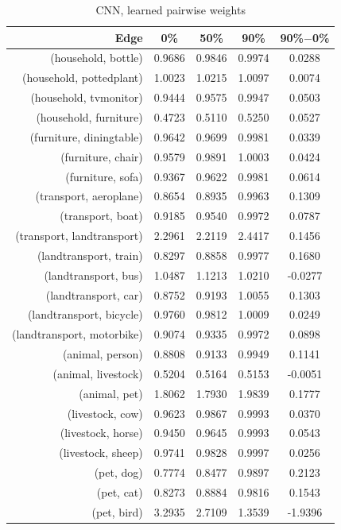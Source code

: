 \documentclass[11pt,a4paper]{article}
\begin{document}
\begin{table}[htbp]
\centering
\begin{tabular}{r|c|c|c|c}
Edge & 0\% & 50\% & 90\% & 90\%$-$0\%\\\hline
(household, bottle)        & 0.9686 & 0.9846 & 0.9974 & 0.0288\\
(household, pottedplant)   & 1.0023 & 1.0215 & 1.0097 & 0.0074\\
(household, tvmonitor)     & 0.9444 & 0.9575 & 0.9947 & 0.0503\\
(household, furniture)     & 0.4723 & 0.5110 & 0.5250 & 0.0527\\
(furniture, diningtable)   & 0.9642 & 0.9699 & 0.9981 & 0.0339\\
(furniture, chair)         & 0.9579 & 0.9891 & 1.0003 & 0.0424\\
(furniture, sofa)          & 0.9367 & 0.9622 & 0.9981 & 0.0614\\
(transport, aeroplane)     & 0.8654 & 0.8935 & 0.9963 & 0.1309\\
(transport, boat)          & 0.9185 & 0.9540 & 0.9972 & 0.0787\\
(transport, landtransport) & 2.2961 & 2.2119 & 2.4417 & 0.1456\\
(landtransport, train)     & 0.8297 & 0.8858 & 0.9977 & 0.1680\\
(landtransport, bus)       & 1.0487 & 1.1213 & 1.0210 & -0.0277\\
(landtransport, car)       & 0.8752 & 0.9193 & 1.0055 & 0.1303\\
(landtransport, bicycle)   & 0.9760 & 0.9812 & 1.0009 & 0.0249\\
(landtransport, motorbike) & 0.9074 & 0.9335 & 0.9972 & 0.0898\\
(animal, person)           & 0.8808 & 0.9133 & 0.9949 & 0.1141\\
(animal, livestock)        & 0.5204 & 0.5164 & 0.5153 & -0.0051\\
(animal, pet)              & 1.8062 & 1.7930 & 1.9839 & 0.1777\\
(livestock, cow)           & 0.9623 & 0.9867 & 0.9993 & 0.0370\\
(livestock, horse)         & 0.9450 & 0.9645 & 0.9993 & 0.0543\\
(livestock, sheep)         & 0.9741 & 0.9828 & 0.9997 & 0.0256\\
(pet, dog)                 & 0.7774 & 0.8477 & 0.9897 & 0.2123\\
(pet, cat)                 & 0.8273 & 0.8884 & 0.9816 & 0.1543\\
(pet, bird)                & 3.2935 & 2.7109 & 1.3539 & -1.9396
\end{tabular}
\caption{CNN, learned pairwise weights}
\label{tab:pairwise}
\end{table}
\end{document}
